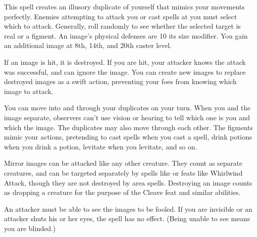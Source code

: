 \begin{spelleffect}
  This spell creates an illusory duplicate of yourself that mimics your movements perfectly. Enemies attempting to attack you or cast spells at you must select which to attack. Generally, roll randomly to see whether the selected target is real or a figment. An image's physical defenses are 10 \add its size modifier. You gain an additional image at 8th, 14th, and 20th caster level. 
  \par If an image is hit, it is destroyed. If you are hit, your attacker knows the attack was successful, and can ignore the image. You can create new images to replace destroyed images as a swift action, preventing your foes from knowing which image to attack.
  \par You can move into and through your duplicates on your turn. When you and the image separate, observers can't use vision or hearing to tell which one is you and which the image. The duplicates may also move through each other. The figments mimic your actions, pretending to cast spells when you cast a spell, drink potions when you drink a potion, levitate when you levitate, and so on.
  \par Mirror images can be attacked like any other creature. They count as separate creatures, and can be targeted separately by spells like  or feats like Whirlwind Attack, though they are not destroyed by area spells. Destroying an image counts as dropping a creature for the purpose of the Cleave feat and similar abilities.
\end{spelleffect}
\begin{spellnotes}
  An attacker must be able to see the images to be fooled. If you are invisible or an attacker shuts his or her eyes, the spell has no effect. (Being unable to see means you are blinded.)
\end{spellnotes}


